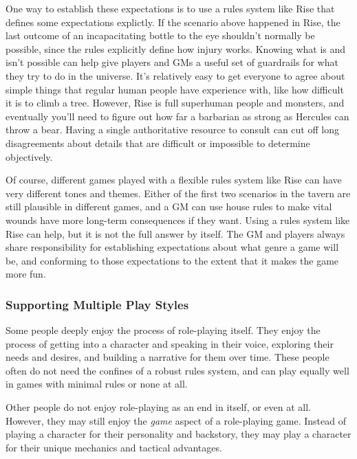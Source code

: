            One way to establish these expectations is to use a rules system like Rise that defines some expectations explictly.
            If the scenario above happened in Rise, the last outcome of an incapacitating bottle to the eye shouldn't normally be possible, since the rules explicitly define how injury works.
            Knowing what is and isn't possible can help give players and GMs a useful set of guardrails for what they try to do in the universe.
            It's relatively easy to get everyone to agree about simple things that regular human people have experience with, like how difficult it is to climb a tree.
            However, Rise is full superhuman people and monsters, and eventually you'll need to figure out how far a barbarian as strong as Hercules can throw a bear.
            Having a single authoritative resource to consult can cut off long disagreements about details that are difficult or impossible to determine objectively.

            Of course, different games played with a flexible rules system like Rise can have very different tones and themes.
            Either of the first two scenarios in the tavern are still plausible in different games, and a GM can use house rules to make vital wounds have more long-term consequences if they want.
            Using a rules system like Rise can help, but it is not the full answer by itself.
            The GM and players always share responsibility for establishing expectations about what genre a game will be, and conforming to those expectations to the extent that it makes the game more fun.

        \subsubsection{Supporting Multiple Play Styles}
            Some people deeply enjoy the process of role-playing itself.
            They enjoy the process of getting into a character and speaking in their voice, exploring their needs and desires, and building a narrative for them over time.
            These people often do not need the confines of a robust rules system, and can play equally well in games with minimal rules or none at all.

            Other people do not enjoy role-playing as an end in itself, or even at all.
            However, they may still enjoy the \textit{game} aspect of a role-playing game.
            Instead of playing a character for their personality and backstory, they may play a character for their unique mechanics and tactical advantages.

